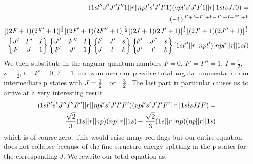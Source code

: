 \begin{equation}
    \begin{split}
        (1sl'' s'' J'' I'' 1\abs{\abs{r}}npl's'J'I'1)
        (npl' s' J' I' 1\abs{\abs{r}}1s lsJI0)=\\
        (-1)^{J'+I+F'+k+J''+I+F''+k}\\
        [(2F+1)(2F'+1)]^{\frac{1}{2}}
         [(2F'+1)(2F''+1)]^{\frac{1}{2}}
         [(2J+1)(2J'+1)]^{\frac{1}{2}}
         [(2J'+1)(2J''+1)]^{\frac{1}{2}}\\
        \begin{Bmatrix}
        J' & F'  &I\\
        F    & J &1
        \end{Bmatrix}
        \begin{Bmatrix}
        J'' & F''  &I\\
        F'    & J' &1
        \end{Bmatrix}
        \begin{Bmatrix}
        l' & J'  &s\\
        J    & l &k
        \end{Bmatrix}
        \begin{Bmatrix}
        l'' & J''  &s\\
        J'    & l' &k
        \end{Bmatrix}
        (1sl''\abs{\abs{r}}npl')(npl'\abs{\abs{r}}1sl)
    \end{split}
\end{equation}
We then substitute in the angular quantum numbers \(F=0\), \(F'=F''=1\), \(I=\frac{1}{2}\), \(s=\frac{1}{2}\), \(l=l''=0\), \(l'=1\), and sum over our possible total angular momenta for our intermediate p states with \(J=\frac{1}{2}\quad \rm{or} \quad \frac{3}{2}\). The last part in particular causes us to arrive at a very interesting result
\begin{equation}
    \begin{split}
        (1sl'' s'' J'' I'' F''\abs{\abs{r}}npl's'J'I'F')
        (npl' s' J' I' F'\abs{\abs{r}}1s lsJIF)=\\
        {\frac{\sqrt{2}}{3}}(1s\abs{\abs{r}}np)(np\abs{\abs{r}}1s)        -{\frac{\sqrt{2}}{3}}(1s\abs{\abs{r}}np)(np\abs{\abs{r}}1s)
    \end{split}    
\end{equation}
which is of course zero. This would raise many red flags but our entire equation does not collapse because of the fine structure energy splitting in the p states for the corresponding \(J\). We rewrite our total equation as.
